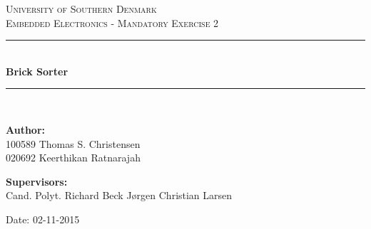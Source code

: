 \begin{titlepage}
\begin{center}

\textsc{\LARGE University of Southern Denmark}\\[1.5cm]
\textsc{\large Embedded Electronics - Mandatory Exercise 2}\\[0.5cm]
\vfill
\hrule ~\\[0.3cm]
{ \huge \bfseries Brick Sorter\\[0.4cm] }
\hrule ~\\[1.5cm]
\vfill

\begin{minipage}[t]{.49\textwidth}
\begin{flushleft} \large
\textbf{Author:}\\
100589 Thomas S. Christensen \\
020692 Keerthikan Ratnarajah\\
\end{flushleft}
\end{minipage}
\begin{minipage}[t]{.49\textwidth}
\begin{flushright} \large
\textbf{Supervisors:} \\
Cand. Polyt. Richard Beck
Jørgen Christian Larsen
\end{flushright}
\end{minipage}

\vspace{1.2cm}
Date: 02-11-2015

\end{center}
\end{titlepage}